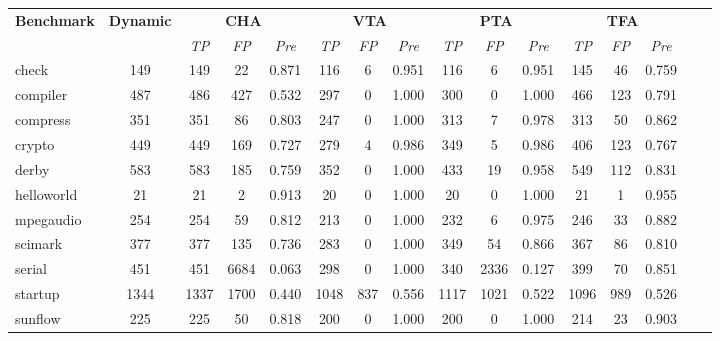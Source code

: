 \documentclass{fac}
\begin{document}

%
\begin{table} %
\begin{threeparttable}[b]
\begin{tabular*}{1.0\textwidth}{|l|c|c|c|c|c|c|c|c|c|c|c|c|c|c|c|}
	\hline
	\multirow{2}{*}{\textbf{Benchmark}} & \multirow{2}{*}{\hspace{-1pt}\textbf{Dynamic}\hspace{-1pt}} & \multicolumn{3}{c|}{\textbf{CHA}} & \multicolumn{3}{c|}{\textbf{VTA}} & \multicolumn{3}{c|}{\textbf{PTA}} & \multicolumn{3}{c|}{\textbf{TFA}}\\
\cline{3-14} &  & \textit{TP} & \textit{FP} & \textit{Pre} & \textit{TP} & \textit{FP} & \textit{Pre} & \textit{TP} & \textit{FP} & \textit{Pre} & \textit{TP} & \textit{FP} & \textit{Pre}\\
	\hline
	\hline
check & 149 & 149 & 22 & 0.871 & 116 & 6 & 0.951 & 116 & 6 & 0.951 & 145 & 46 & 0.759\\
compiler & 487 & 486 & 427 & 0.532 & 297 & 0 & 1.000 & 300 & 0 & 1.000 & 466 & 123 & 0.791\\
compress & 351 & 351 & 86 & 0.803 & 247 & 0 & 1.000 & 313 & 7 & 0.978 & 313 & 50 & 0.862\\
crypto & 449 & 449 & 169 & 0.727 & 279 & 4 & 0.986 & 349 & 5 & 0.986 & 406 & 123 & 0.767\\
derby & 583 & 583 & 185 & 0.759 & 352 & 0 & 1.000 & 433 & 19 & 0.958 & 549 & 112 & 0.831\\
helloworld & 21 & 21 & 2 & 0.913 & 20 & 0 & 1.000 & 20 & 0 & 1.000 & 21 & 1 & 0.955\\
mpegaudio & 254 & 254 & 59 & 0.812 & 213 & 0 & 1.000 & 232 & 6 & 0.975 & 246 & 33 & 0.882\\
scimark & 377 & 377 & 135 & 0.736 & 283 & 0 & 1.000 & 349 & 54 & 0.866 & 367 & 86 & 0.810\\
serial & 451 & 451 & 6684 & 0.063 & 298 & 0 & 1.000 & 340 & 2336 & 0.127 & 399 & 70 & 0.851\\
startup & 1344 & 1337 & 1700 & 0.440 & 1048 & 837 & 0.556 & 1117 & 1021 & 0.522 & 1096 & 989 & 0.526\\
sunflow & 225 & 225 & 50 & 0.818 & 200 & 0 & 1.000 & 200 & 0 & 1.000 & 214 & 23 & 0.903\\

\end{tabular*}
\end{threeparttable}
\end{table}
\end{document}
